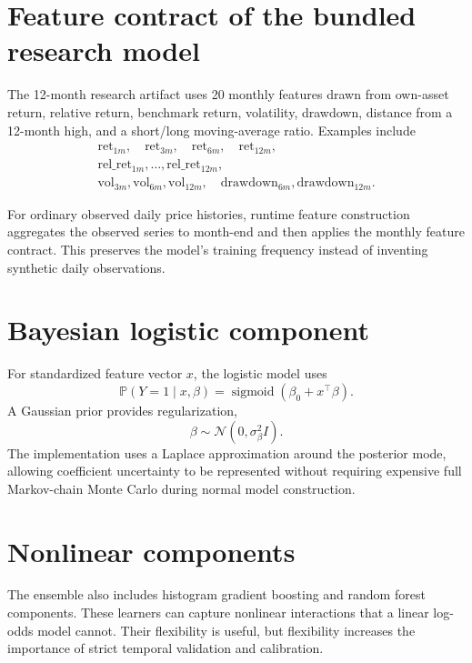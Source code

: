 \documentclass[11pt]{article}
\newcommand{\Prb}{\mathbb{P}}
\newcommand{\sigmoid}{\operatorname{sigmoid}}
\begin{document}
\section{Feature contract of the bundled research model}

The 12-month research artifact uses 20 monthly features drawn from own-asset return, relative return, benchmark return, volatility, drawdown, distance from a 12-month high, and a short/long moving-average ratio. Examples include
\begin{align}
\text{ret}_{1m},\quad \text{ret}_{3m},\quad \text{ret}_{6m},\quad \text{ret}_{12m},\\
\text{rel\_ret}_{1m},\ldots,\text{rel\_ret}_{12m},\\
\text{vol}_{3m},\text{vol}_{6m},\text{vol}_{12m},\quad \text{drawdown}_{6m},\text{drawdown}_{12m}.
\end{align}

For ordinary observed daily price histories, runtime feature construction aggregates the observed series to month-end and then applies the monthly feature contract. This preserves the model's training frequency instead of inventing synthetic daily observations.

\section{Bayesian logistic component}

For standardized feature vector $x$, the logistic model uses
\begin{equation}
\Prb(Y=1\mid x,\beta)=\sigmoid(\beta_0+x^\top\beta).
\end{equation}
A Gaussian prior provides regularization,
\begin{equation}
\beta\sim\mathcal N(0,\sigma_\beta^2 I).
\end{equation}
The implementation uses a Laplace approximation around the posterior mode, allowing coefficient uncertainty to be represented without requiring expensive full Markov-chain Monte Carlo during normal model construction.

\section{Nonlinear components}

The ensemble also includes histogram gradient boosting and random forest components. These learners can capture nonlinear interactions that a linear log-odds model cannot. Their flexibility is useful, but flexibility increases the importance of strict temporal validation and calibration.
\end{document}
